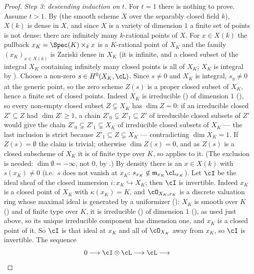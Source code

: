 \begin{proof}
\emph{Step 3: descending induction on $t$.}  For $t=1$ there is nothing to
prove.  Assume $t>1$.  By  (the smooth
scheme $X$ over the separably closed field $k$), $X(k)$ is dense in $X$,
and since $X$ is a variety of dimension $1$ a finite set of points is not
dense: there are infinitely many $k$-rational points of $X$.
For $x\in X(k)$ the pullback $x_K=\Spec(K)\times_kx$ is a $K$-rational
point of $X_K$ and the family $(x_K)_{x\in X(k)}$ is Zariski dense in
$X_K$ (it is infinite, and a closed subset of the integral
 $X_K$ containing infinitely many closed
points is all of $X_K$; $X_K$ is integral by ).
Choose a non-zero $s\in H^0(X_K,\cL)$.  Since $s\neq0$ and $X_K$ is
integral, $s_\eta\neq0$ at the generic point, so the zero scheme
$Z(s)$ is a proper closed subset of $X_K$, hence a finite set of closed
points.  Indeed $X_K$ is irreducible () of
dimension $1$ (), so every non-empty closed
subset $Z\subsetneq X_K$ has $\dim Z=0$: if an irreducible closed
$Z'\subseteq Z$ had $\dim Z'\ge1$, a chain
$Z'_0\subsetneq Z'_1\subseteq Z'$ of irreducible closed subsets of $Z'$
would give the chain $Z'_0\subsetneq Z'_1\subsetneq X_K$ of irreducible
closed subsets of $X_K$ --- the last inclusion is strict because
$Z'_1\subseteq Z\subsetneq X_K$ --- contradicting $\dim X_K=1$.  If
$Z(s)=\emptyset$ the claim is trivial; otherwise $\dim Z(s)=0$, and as $Z(s)$ is a closed subscheme of $X_K$ it is
of finite type over $K$, so  applies to it.
(The exclusion is needed: $\dim\emptyset=-\infty$, not $0$, by
.)  By density there is an
$x\in X(k)$ with
$s(x_K)\neq0$ (i.e.\ $s$ does not vanish at $x_K$: $s_{x_K}\notin
\mathfrak m_{x_K}\cL_{x_K}$).
Let $\cI$ be the ideal sheaf of the closed immersion
$i:x_K\hookrightarrow X_K$; then $\cI$ is invertible.  Indeed $x_K$ is a
closed point of $X_K$ with $\kappa(x_K)=K$, and $\cO_{X_K,x_K}$ is a
discrete valuation ring whose maximal ideal is generated by a
uniformizer (): $X_K$ is smooth
over $K$ () and of finite type over
$K$, it is irreducible () of dimension $1$
(), as used just above, so its unique
irreducible component has dimension one, and $x_K$ is a closed point of
it.  So $\cI$ is that ideal at $x_K$
and all of $\cO_{X_K}$ away from $x_K$, so $\cI$ is invertible.  The
sequence
\[
0\longrightarrow\cI\otimes\cL\longrightarrow\cL\longrightarrow
\]
\end{proof}
